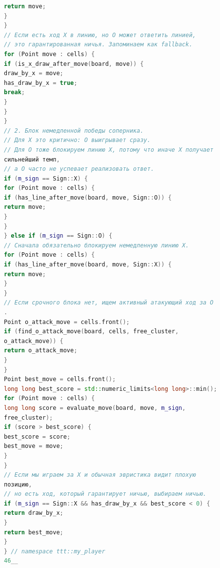 \documentclass[a4paper,14pt]{extarticle}
\begin{document}
\begin{lstlisting}[language=C++,caption={Файл my\_player.cpp},label={lst:cpp}]
return move;
}
}
// Если есть ход X в линию, но O может ответить линией,
// это гарантированная ничья. Запоминаем как fallback.
for (Point move : cells) {
if (is_x_draw_after_move(board, move)) {
draw_by_x = move;
has_draw_by_x = true;
break;
}
}
}
// 2. Блок немедленной победы соперника.
// Для X это критично: O выигрывает сразу.
// Для O тоже блокируем линию X, потому что иначе X получает
сильнейший темп,
// а O часто не успевает реализовать ответ.
if (m_sign == Sign::X) {
for (Point move : cells) {
if (has_line_after_move(board, move, Sign::O)) {
return move;
}
}
} else if (m_sign == Sign::O) {
// Сначала обязательно блокируем немедленную линию X.
for (Point move : cells) {
if (has_line_after_move(board, move, Sign::X)) {
return move;
}
}
// Если срочного блока нет, ищем активный атакующий ход за O
.
Point o_attack_move = cells.front();
if (find_o_attack_move(board, cells, free_cluster,
o_attack_move)) {
return o_attack_move;
}
}
Point best_move = cells.front();
long long best_score = std::numeric_limits<long long>::min();
for (Point move : cells) {
long long score = evaluate_move(board, move, m_sign,
free_cluster);
if (score > best_score) {
best_score = score;
best_move = move;
}
}
// Если мы играем за X и обычная эвристика видит плохую
позицию,
// но есть ход, который гарантирует ничью, выбираем ничью.
if (m_sign == Sign::X && has_draw_by_x && best_score < 0) {
return draw_by_x;
}
return best_move;
}
} // namespace ttt::my_player
46__

\end{lstlisting}
\end{document}
